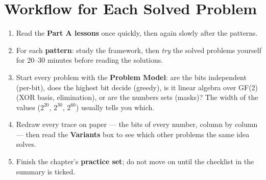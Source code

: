 \section*{Workflow for Each Solved Problem}

\begin{insightbox}
\begin{center}
\end{center}
\begin{enumerate}[leftmargin=*]
    \item Read the \textbf{Part A lessons} once quickly, then again slowly after the patterns.
    \item For each \textbf{pattern}: study the framework, then \emph{try} the solved problems yourself for 20--30 minutes before reading the solutions.
    \item Start every problem with the \textbf{Problem Model}: are the bits independent (per-bit), does the highest bit decide (greedy), is it linear algebra over GF(2) (XOR basis, elimination), or are the numbers sets (masks)? The width of the values ($2^{20}$, $2^{30}$, $2^{60}$) usually tells you which.
    \item Redraw every trace on paper --- the bits of every number, column by column --- then read the \textbf{Variants} box to see which other problems the same idea solves.
    \item Finish the chapter's \textbf{practice set}; do not move on until the checklist in the summary is ticked.
\end{enumerate}
\end{insightbox}

